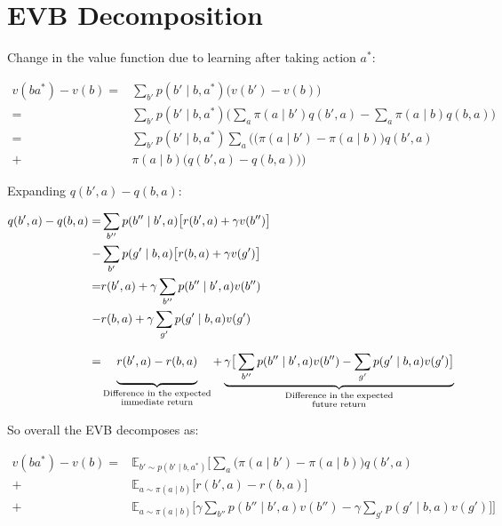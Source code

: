 \documentclass{article}
\begin{document}
\section*{EVB Decomposition}
Change in the value function due to learning after taking action $a^*$:

\begin{align}
v(ba^*)-v(b)=&\sum_{b'}p(b'\mid b, a^*)\Big(v(b')-v(b)\Big)\\
=&\sum_{b'}p(b'\mid b, a^*)\Big(\sum_a \pi(a\mid b')q(b', a)-\sum_{a} \pi(a\mid b)q(b,a)\Big) \nonumber \\
=&\sum_{b'}p(b'\mid b, a^*)\sum_a\Big(\big(\pi(a\mid b')-\pi(a\mid b)\big)q(b',a) \nonumber \\
+&\pi(a\mid b)\big(q(b', a) - q(b, a)\big)\Big) \nonumber
\end{align}

Expanding $q(b', a) - q(b, a)$:

\begin{align}
q(b', a)-q(b, a)=&\sum_{b''}p(b''\mid b', a)\big[r(b',a) + \gamma v(b'')\big]\\
-&\sum_{b'}p(g'\mid b, a)\big[r(b,a) + \gamma v(g')\big]\nonumber\\
=& r(b',a) + \gamma \sum_{b''}p(b''\mid b', a)v(b'')\nonumber \\
-& r(b,a) + \gamma \sum_{g'}p(g'\mid b, a)v(g')\nonumber \\
=& \underbrace{\vphantom{ \left(\frac{a^{\frac{0.3}{`}}}{b}\right)} r(b',a) - r(b,a)}_{\substack{\text{Difference in the expected} \\ \text{immediate return}}} + \underbrace{\gamma \big[ \sum_{b''}p(b''\mid b', a)v(b'') - \sum_{g'}p(g'\mid b, a)v(g') \big]}_{\substack{\text{Difference in the expected} \\ \text{future return}}}\nonumber
\end{align}

So overall the EVB decomposes as:

\begin{align}
    v(ba^*)-v(b) =& \mathbb{E}_{b'\sim p(b'\mid b, a^*)}\Big[\sum_a \big(\pi(a\mid b')-\pi(a\mid b)\big)q(b',a) \\
    +& \mathbb{E}_{a\sim \pi(a\mid b)}\big[r(b',a) - r(b,a)\big] \nonumber \\ 
    +& \mathbb{E}_{a\sim \pi(a\mid b)}\big[\gamma \sum_{b''}p(b''\mid b', a)v(b'') - \gamma \sum_{g'}p(g'\mid b, a)v(g') \big] \Big] \nonumber
\end{align}
\end{document}
